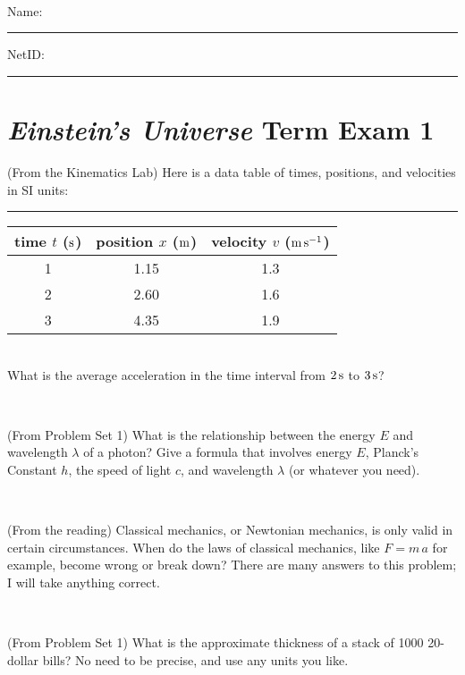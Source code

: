 \documentclass[12pt, letterpaper]{article}
\begin{document}
\vfill ~


\cleardoublepage



\noindent
Name: \rule[-1ex]{0.60\textwidth}{0.1pt}
NetID: \rule[-1ex]{0.20\textwidth}{0.1pt}

\section*{\textsl{Einstein's Universe} Term Exam 1}
\setcounter{problem}{1}


\begin{problem} (From the Kinematics Lab)
Here is a data table of times, positions, and velocities in SI units:\\
\rule{1.0in}{0pt}\begin{tabular}{c|c|c}
time $t$ ($\mathrm{s}$) & position $x$ ($\mathrm{m}$) & velocity $v$ ($\mathrm{m}\,\mathrm{s}^{-1}$) \\
\hline
1 & 1.15 & 1.3 \\
2 & 2.60 & 1.6 \\
3 & 4.35 & 1.9 \\
\hline
\end{tabular}\\
What is the average acceleration in the time interval from $2\,\mathrm{s}$ to $3\,\mathrm{s}$?
\end{problem}


\vfill ~

\begin{problem} (From Problem Set 1)
What is the relationship between the energy $E$ and wavelength
$\lambda$ of a photon? Give a formula that involves energy $E$,
Planck's Constant $h$, the speed of light $c$, and wavelength
$\lambda$ (or whatever you need).
\end{problem}

\vfill ~

\begin{problem} (From the reading)
Classical mechanics, or Newtonian mechanics, is only valid in certain
circumstances. When do the laws of classical mechanics, like $F =
m\,a$ for example, become wrong or break down? There are many answers
to this problem; I will take anything correct.
\end{problem}


\vfill ~

\begin{problem} (From Problem Set 1)
What is the approximate thickness of a stack of 1000 20-dollar bills?
No need to be precise, and use any units you like.
\end{problem}
\end{document}
